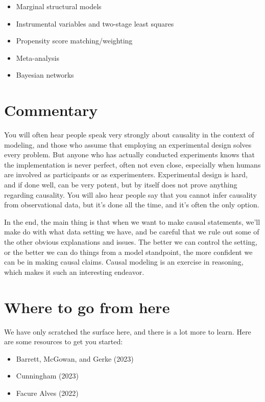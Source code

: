 \documentclass[
  letterpaper,
]{krantz}
\providecommand{\tightlist}{%
  \setlength{\itemsep}{0pt}\setlength{\parskip}{0pt}}\usepackage{longtable,booktabs,array}
\begin{document}
\begin{itemize}
\tightlist
\item
  Marginal structural models
\item
  Instrumental variables and two-stage least squares
\item
  Propensity score matching/weighting
\item
  Meta-analysis
\item
  Bayesian networks
\end{itemize}

\section{Commentary}\label{commentary-3}

You will often hear people speak very strongly about causality in the
context of modeling, and those who assume that employing an experimental
design solves every problem. But anyone who has actually conducted
experiments knows that the implementation is never perfect, often not
even close, especially when humans are involved as participants or as
experimenters. Experimental design is hard, and if done well, can be
very potent, but by itself does not prove anything regarding causality.
You will also hear people say that you cannot infer causality from
observational data, but it's done all the time, and it's often the only
option.

In the end, the main thing is that when we want to make causal
statements, we'll make do with what data setting we have, and be careful
that we rule out some of the other obvious explanations and issues. The
better we can control the setting, or the better we can do things from a
model standpoint, the more confident we can be in making causal claims.
Causal modeling is an exercise in reasoning, which makes it such an
interesting endeavor.

\section{Where to go from here}\label{where-to-go-from-here-4}

We have only scratched the surface here, and there is a lot more to
learn. Here are some resources to get you started:

\begin{itemize}
\tightlist
\item
  Barrett, McGowan, and Gerke (2023)
\item
  Cunningham (2023)
\item
  Facure Alves (2022)
\end{itemize}
\end{document}
